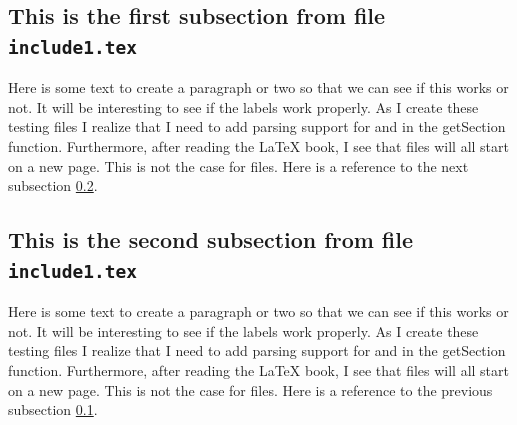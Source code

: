 ﻿\subsection{This is the first subsection from file \texttt{include1.tex}}
\label{section11}

Here is some text to create a paragraph or two so that we
can see if this works or not.  It will be interesting to see
if the labels work properly.  As I create these testing files
I realize that I need to add parsing support for \verb##
and \verb## in the getSection function.   Furthermore,
after reading the \LaTeX{} book, I see that \verb## 
files will all start on a new page.  This is not the case for
\verb## files.  Here is a reference to the next subsection \ref{section12}.

\subsection{This is the second subsection from file \texttt{include1.tex}}
\label{section12}

Here is some text to create a paragraph or two so that we
can see if this works or not.  It will be interesting to see
if the labels work properly.  As I create these testing files
I realize that I need to add parsing support for \verb##
and \verb## in the getSection function.   Furthermore,
after reading the \LaTeX{} book, I see that \verb## 
files will all start on a new page.  This is not the case for
\verb## files.  Here is a reference to the previous subsection \ref{section11}.

\endinput

Here is text that should never be seen.